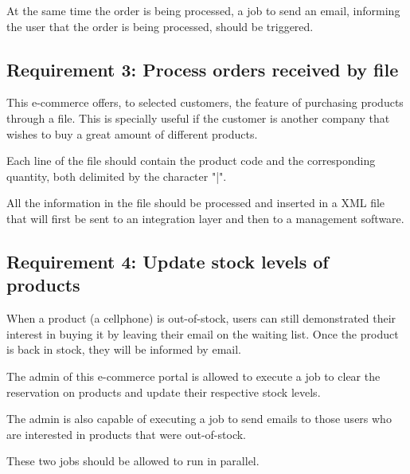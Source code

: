 At the same time the order is being processed, a job to send an email, informing the user that the order is being processed, should be triggered.

\subsection{Requirement 3:  Process orders received by file}
\label{req3}

This e-commerce offers, to selected customers, the feature of purchasing products through a file. This is specially useful if the customer is another company that wishes to buy a great amount of different products.

Each line of the file should contain the product code and the corresponding quantity, both delimited by the character "|".

All the information in the file should be processed and inserted in a XML file that will first be sent to an integration layer and then to a management software.

\subsection{Requirement 4: Update stock levels of products}
\label{req4}

When a product (a cellphone) is out-of-stock, users can still demonstrated their interest in buying it by leaving their email on the waiting list. Once the product is back in stock, they will be informed by email.

The admin of this e-commerce portal is allowed to execute a job to clear the reservation on products and update their respective stock levels.

The admin is also capable of executing a job to send emails to those users who are interested in products that were out-of-stock.

These two jobs should be allowed to run in parallel.

